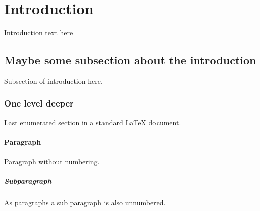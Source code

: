 \documentclass[10pt, a4paper]{article}
\begin{document}
\tableofcontents

\newpage

\section{Introduction}
Introduction text here

\subsection{Maybe some subsection about the introduction}
Subsection of introduction here.

\subsubsection{One level deeper}
Last enumerated section in a standard \LaTeX{} document.

\paragraph{Paragraph}
Paragraph without numbering.

\subparagraph{Subparagraph}
As paragraphs a sub paragraph is also unnumbered.
\end{document}
